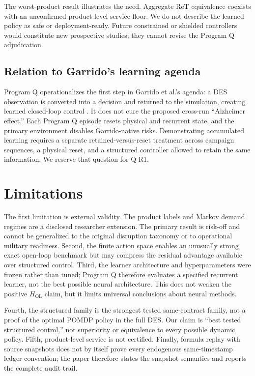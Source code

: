 \documentclass[preprint,12pt]{elsarticle}
\newcommand{\HOL}{H_{\mathrm{OL}}}
\begin{document}
The worst-product result illustrates the need. Aggregate ReT equivalence coexists with an unconfirmed product-level service floor. We do not describe the learned policy as safe or deployment-ready. Future constrained or shielded controllers would constitute new prospective studies; they cannot revise the Program Q adjudication.

\subsection{Relation to Garrido's learning agenda}

Program Q operationalizes the first step in Garrido et al.'s agenda: a DES observation is converted into a decision and returned to the simulation, creating learned closed-loop control \cite{garrido2024iccl}. It does not cure the proposed cross-run ``Alzheimer effect.'' Each Program Q episode resets physical and recurrent state, and the primary environment disables Garrido-native risks. Demonstrating accumulated learning requires a separate retained-versus-reset treatment across campaign sequences, a physical reset, and a structured controller allowed to retain the same information. We reserve that question for Q-R1.



\section{Limitations}

The first limitation is external validity. The product labels and Markov demand regimes are a disclosed researcher extension. The primary result is risk-off and cannot be generalized to the original disruption taxonomy or to operational military readiness. Second, the finite action space enables an unusually strong exact open-loop benchmark but may compress the residual advantage available over structured control. Third, the learner architecture and hyperparameters were frozen rather than tuned; Program Q therefore evaluates a specified recurrent learner, not the best possible neural architecture. This does not weaken the positive $\HOL$ claim, but it limits universal conclusions about neural methods.

Fourth, the structured family is the strongest tested same-contract family, not a proof of the optimal POMDP policy in the full DES. Our claim is ``best tested structured control,'' not superiority or equivalence to every possible dynamic policy. Fifth, product-level service is not certified. Finally, formula replay with source snapshots does not by itself prove every endogenous same-timestamp ledger convention; the paper therefore states the snapshot semantics and reports the complete audit trail.
\end{document}
